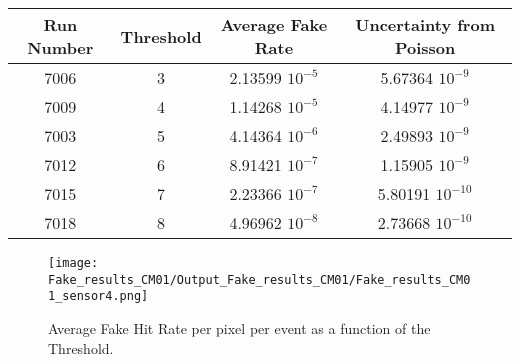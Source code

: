 \documentclass[a4papper, 11pt]{article}
\begin{document}
            \begin{center}
                \begin{tabular}{|c|c|c|c|}
                  \hline %
\rowcolor{light-gray}  Run Number  &   Threshold   &   Average Fake Rate    &   Uncertainty from Poisson         \tabularnewline
                  \hline %
                        7006    &       3       &  2.13599 $10^{-5}$  & 5.67364 $10^{-9}$ \tabularnewline
                  \hline %
                        7009    &       4       &  1.14268 $10^{-5}$  & 4.14977 $10^{-9}$ \tabularnewline
                  \hline %
                        7003    &       5       &  4.14364 $10^{-6}$  & 2.49893 $10^{-9}$ \tabularnewline
                 \hline %
                        7012    &       6       &  8.91421 $10^{-7}$  & 1.15905 $10^{-9}$ \tabularnewline
                  \hline %
                        7015    &       7       &  2.23366 $10^{-7}$  & 5.80191 $10^{-10}$ \tabularnewline
                  \hline %
                        7018    &       8       &  4.96962 $10^{-8}$  & 2.73668 $10^{-10}$ \tabularnewline
                  \hline %
                \end{tabular}
            \end{center}
        \begin{figure}[!h]
            \centering
            \texttt{[image: Fake\_results\_CM01/Output\_Fake\_results\_CM01/Fake\_results\_CM01\_sensor4.png]}
            \caption{Average Fake Hit Rate per pixel per event as a function of the Threshold.}
        \end{figure}
    \FloatBarrier 
\end{document}
